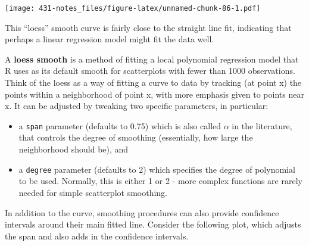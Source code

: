 \documentclass[
]{book}
\providecommand{\tightlist}{%
  \setlength{\itemsep}{0pt}\setlength{\parskip}{0pt}}
\begin{document}
\texttt{[image: 431-notes\_files/figure-latex/unnamed-chunk-86-1.pdf]}

This ``loess'' smooth curve is fairly close to the straight line fit, indicating that perhaps a linear regression model might fit the data well.

A \textbf{loess smooth} is a method of fitting a local polynomial regression model that R uses as its default smooth for scatterplots with fewer than 1000 observations. Think of the loess as a way of fitting a curve to data by tracking (at point x) the points within a neighborhood of point x, with more emphasis given to points near x. It can be adjusted by tweaking two specific parameters, in particular:

\begin{itemize}
\tightlist
\item
  a \texttt{span} parameter (defaults to 0.75) which is also called \(\alpha\) in the literature, that controls the degree of smoothing (essentially, how large the neighborhood should be), and
\item
  a \texttt{degree} parameter (defaults to 2) which specifies the degree of polynomial to be used. Normally, this is either 1 or 2 - more complex functions are rarely needed for simple scatterplot smoothing.
\end{itemize}

In addition to the curve, smoothing procedures can also provide confidence intervals around their main fitted line. Consider the following plot, which adjusts the span and also adds in the confidence intervals.
\end{document}
